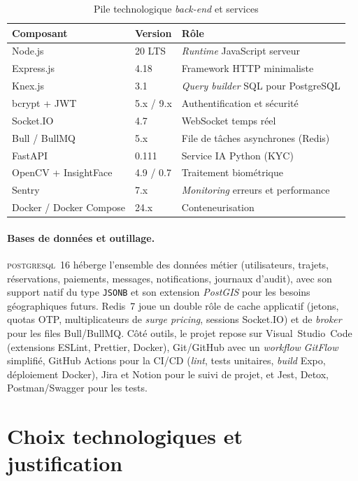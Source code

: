 \documentclass[12pt, a4paper, oneside]{report}
\begin{document}
\begin{table}[H]
\centering
\footnotesize
\begin{tabularx}{\textwidth}{|l|l|X|}
\hline
\rowcolor{rohlight}
\textbf{Composant} & \textbf{Version} & \textbf{Rôle} \\
\hline
Node.js & 20 LTS & \textit{Runtime} JavaScript serveur \\
\hline
Express.js & 4.18 & Framework HTTP minimaliste \\
\hline
Knex.js & 3.1 & \textit{Query builder} SQL pour PostgreSQL \\
\hline
bcrypt + JWT & 5.x / 9.x & Authentification et sécurité \\
\hline
Socket.IO & 4.7 & WebSocket temps réel \\
\hline
Bull / BullMQ & 5.x & File de tâches asynchrones (Redis) \\
\hline
FastAPI & 0.111 & Service IA Python (KYC) \\
\hline
OpenCV + InsightFace & 4.9 / 0.7 & Traitement biométrique \\
\hline
Sentry & 7.x & \textit{Monitoring} erreurs et performance \\
\hline
Docker / Docker Compose & 24.x & Conteneurisation \\
\hline
\end{tabularx}
  \caption{Pile technologique \textit{back-end} et services}
  \label{tab:tech-back}
\end{table}

\paragraph{Bases de données et outillage.} \textsc{postgresql}~16 héberge l'ensemble des données métier (utilisateurs, trajets, réservations, paiements, messages, notifications, journaux d'audit), avec son support natif du type \texttt{JSONB} et son extension \textit{PostGIS} pour les besoins géographiques futurs. Redis~7 joue un double rôle de cache applicatif (jetons, quotas OTP, multiplicateurs de \textit{surge pricing}, sessions Socket.IO) et de \textit{broker} pour les files Bull/BullMQ. Côté outils, le projet repose sur Visual~Studio~Code (extensions ESLint, Prettier, Docker), Git/GitHub avec un \textit{workflow} \textit{GitFlow} simplifié, GitHub Actions pour la CI/CD (\textit{lint}, tests unitaires, \textit{build} Expo, déploiement Docker), Jira et Notion pour le suivi de projet, et Jest, Detox, Postman/Swagger pour les tests.

\section{Choix technologiques et justification}
\label{sec:choix-tech}
\end{document}
